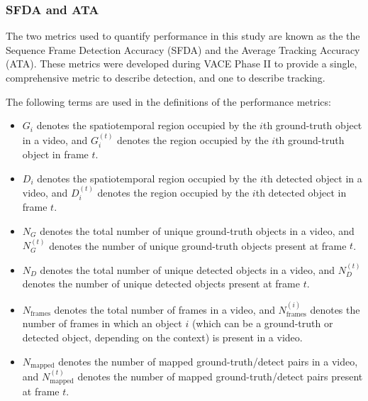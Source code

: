 \documentclass[smallcondensed, final]{svjour3}
\begin{document}



\subsubsection{SFDA and ATA}

The two metrics used to quantify performance in this study are known as the the Sequence Frame Detection Accuracy (SFDA) and the Average Tracking Accuracy (ATA). These metrics were developed during VACE Phase II to provide a single, comprehensive metric to describe detection, and one to describe tracking.

The following terms are used in the definitions of the performance metrics:
\begin{itemize}
\renewcommand{\labelitemi}{$\bullet$}
\item $G_{i}$ denotes the spatiotemporal region occupied by the $i$th ground-truth object in a video, and $G_{i}^{(t)}$ denotes the region occupied by the $i$th ground-truth object in frame $t$.
\item $D_{i}$ denotes the spatiotemporal region occupied by the $i$th detected object in a video, and $D_{i}^{(t)}$ denotes the region occupied by the $i$th detected object in frame $t$.
\item $N_{G}$ denotes the total number of unique ground-truth objects in a video, and $N_{G}^{(t)}$ denotes the number of unique ground-truth objects present at frame $t$.
\item $N_{D}$ denotes the total number of unique detected objects in a video, and $N_{D}^{(t)}$ denotes the number of unique detected objects present at frame $t$.
\item $N_{\text{frames}}$ denotes the total number of frames in a video, and $N_{\text{frames}}^{(i)}$ denotes the number of frames in which an object $i$ (which can be a ground-truth or detected object, depending on the context) is present in a video.
\item $N_{\text{mapped}}$ denotes the number of mapped ground-truth/detect pairs in a video, and $N_{\text{mapped}}^{(t)}$ denotes the number of mapped ground-truth/detect pairs present at frame $t$.
\end{itemize}
\end{document}
